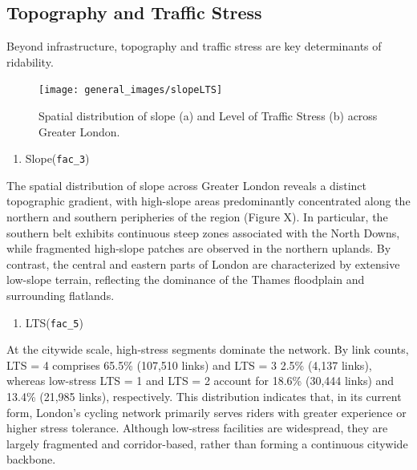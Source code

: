\documentclass[
  12pt,
  oneside]{book}
\providecommand{\tightlist}{%
  \setlength{\itemsep}{0pt}\setlength{\parskip}{0pt}}
\begin{document}
\subsection{Topography and Traffic Stress}\label{topography-and-traffic-stress}

Beyond infrastructure, topography and traffic stress are key determinants of ridability.

\begin{figure}

{\centering \texttt{[image: general\_images/slopeLTS]} 

}

\caption{Spatial distribution of slope (a) and Level of Traffic Stress (b) across Greater London.}\label{fig:slopeLTS}
\end{figure}

\begin{enumerate}
\def\labelenumi{\arabic{enumi}.}
\tightlist
\item
  Slope(\texttt{fac\_3})
\end{enumerate}

The spatial distribution of slope across Greater London reveals a distinct topographic gradient, with high-slope areas predominantly concentrated along the northern and southern peripheries of the region (Figure X). In particular, the southern belt exhibits continuous steep zones associated with the North Downs, while fragmented high-slope patches are observed in the northern uplands. By contrast, the central and eastern parts of London are characterized by extensive low-slope terrain, reflecting the dominance of the Thames floodplain and surrounding flatlands.

\begin{enumerate}
\def\labelenumi{\arabic{enumi}.}
\setcounter{enumi}{1}
\tightlist
\item
  LTS(\texttt{fac\_5})
\end{enumerate}

At the citywide scale, high-stress segments dominate the network. By link counts, LTS = 4 comprises 65.5\% (107,510 links) and LTS = 3 2.5\% (4,137 links), whereas low-stress LTS = 1 and LTS = 2 account for 18.6\% (30,444 links) and 13.4\% (21,985 links), respectively. This distribution indicates that, in its current form, London's cycling network primarily serves riders with greater experience or higher stress tolerance. Although low-stress facilities are widespread, they are largely fragmented and corridor-based, rather than forming a continuous citywide backbone.
\end{document}
